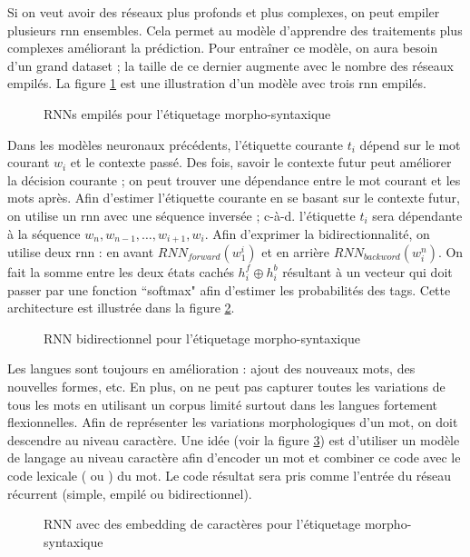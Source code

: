 \documentclass{KodeBook}
\begin{document}
Si on veut avoir des réseaux plus profonds et plus complexes, on peut empiler plusieurs \ac{rnn} ensembles. 
Cela permet au modèle d'apprendre des traitements plus complexes améliorant la prédiction.
Pour entraîner ce modèle, on aura besoin d'un grand dataset ; la taille de ce dernier augmente avec le nombre des réseaux empilés.
La figure \ref{fig:pos-rnn2} est une illustration d'un modèle avec trois \ac{rnn} empilés.
\begin{figure}[!ht]
	\centering
	\caption[RNNs empilés pour l'étiquetage morpho-syntaxique]{RNNs empilés pour l'étiquetage morpho-syntaxique \cite{2019-jurafsky-martin}\label{fig:pos-rnn2}}
\end{figure}

Dans les modèles neuronaux précédents, l'étiquette courante $t_i$ dépend sur le mot courant $w_i$ et le contexte passé. 
Des fois, savoir le contexte futur peut améliorer la décision courante ; on peut trouver une dépendance entre le mot courant et les mots après. 
Afin d'estimer l'étiquette courante en se basant sur le contexte futur, on utilise un \ac{rnn} avec une séquence inversée ; c-à-d. l'étiquette $t_i$ sera dépendante à la séquence $w_n, w_{n-1}, \ldots, w_{i+1}, w_{i}$. 
Afin d'exprimer la bidirectionnalité, on utilise deux \ac{rnn} : en avant $RNN_{forward}(w_1^i)$ et en arrière $RNN_{backword}(w_i^n)$. 
On fait la somme entre les deux états cachés $h_i^f \oplus h_i^b$ résultant à un vecteur qui doit passer par une fonction ``softmax" afin d'estimer les probabilités des tags. 
Cette architecture est illustrée dans la figure \ref{fig:pos-rnn3}.
\begin{figure}[!ht]
	\centering
	\caption[RNN bidirectionnel pour l'étiquetage morpho-syntaxique]{RNN bidirectionnel pour l'étiquetage morpho-syntaxique \cite{2019-jurafsky-martin}\label{fig:pos-rnn3}}
\end{figure}

Les langues sont toujours en amélioration : ajout des nouveaux mots, des nouvelles formes, etc. 
En plus, on ne peut pas capturer toutes les variations de tous les mots en utilisant un corpus limité surtout dans les langues fortement flexionnelles. 
Afin de représenter les variations morphologiques d'un mot, on doit descendre au niveau caractère.
Une idée (voir la figure \ref{fig:pos-rnn4}) est d'utiliser un modèle de langage au niveau caractère afin d'encoder un mot et combiner ce code avec le code lexicale ( ou ) du mot. 
Le code résultat sera pris comme l'entrée du réseau récurrent (simple, empilé ou bidirectionnel).
\begin{figure}[ht]
	\centering
	\caption[Embedding de caractères pour l'étiquetage morpho-syntaxique]{RNN avec des embedding de caractères pour l'étiquetage morpho-syntaxique \cite{2019-jurafsky-martin}\label{fig:pos-rnn4}}
\end{figure}
\end{document}
